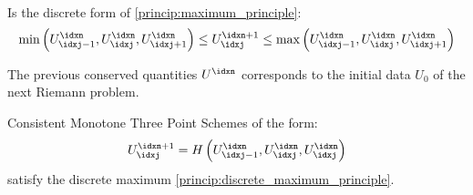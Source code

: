 \begin{principbox}\nospacing
    \begin{princip}\label{princip:discrete_maximum_principle}\leavevmode\\
        Is the discrete form of \cref{princip:maximum_principle}:
        \begin{align}
          \min \left(U_{\idxj-1}^{\idxn},U_{\idxj}^{\idxn},U_{\idxj+1}^{\idxn}\right)
          \leq U_{\idxj}^{\idxn+1}\leq\max\left(U_{\idxj-1}^{\idxn},U_{\idxj}^{\idxn},U_{\idxj+1}^{\idxn}\right)
        \end{align}
        \begin{figure}[H]
            \centering{
              \def\svgwidth{120pt}
              \resizebox{0.6\linewidth}{!}{}
            }
        \end{figure}
    \end{princip}
\end{principbox}
\begin{explanationbox}\nospacing
    \begin{explanation}
        The previous conserved quantities $U^{\idxn}$ corresponds to the initial data $U_{0}$ of the next
        Riemann problem.
    \end{explanation}
\end{explanationbox}
\begin{propertybox}\nospacing
    \begin{property}\label{property:consistent_monotone_three_point_schemes}
        Consistent Monotone Three Point Schemes of the form:
        \begin{align}
          U_{\idxj}^{\idxn+1}=H \left(U_{\idxj-1}^{\idxn},U_{\idxj}^{\idxn},U_{\idxj}^{\idxn}\right)
        \end{align}
        satisfy the discrete maximum \cref{princip:discrete_maximum_principle}.
    \end{property}
\end{propertybox}
